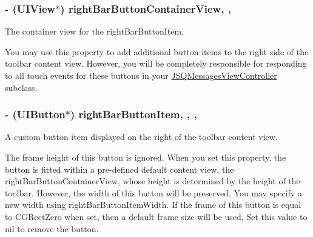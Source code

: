\subsubsection[{right\+Bar\+Button\+Container\+View}]{\setlength{\rightskip}{0pt plus 5cm}-\/ (U\+I\+View$\ast$) right\+Bar\+Button\+Container\+View\hspace{0.3cm}{\ttfamily [read]}, {\ttfamily [nonatomic]}, {\ttfamily [weak]}}\label{interface_j_s_q_messages_toolbar_content_view_a975f0ae0017e0fe18ba7f75dd12323f3}
The container view for the right\+Bar\+Button\+Item.

You may use this property to add additional button items to the right side of the toolbar content view. However, you will be completely responsible for responding to all touch events for these buttons in your {\ttfamily \hyperlink{interface_j_s_q_messages_view_controller}{J\+S\+Q\+Messages\+View\+Controller}} subclass. \hypertarget{interface_j_s_q_messages_toolbar_content_view_a376f245e23e4061f5c3bcc48304c7698}{}
\subsubsection[{right\+Bar\+Button\+Item}]{\setlength{\rightskip}{0pt plus 5cm}-\/ (U\+I\+Button$\ast$) right\+Bar\+Button\+Item\hspace{0.3cm}{\ttfamily [read]}, {\ttfamily [write]}, {\ttfamily [nonatomic]}, {\ttfamily [weak]}}\label{interface_j_s_q_messages_toolbar_content_view_a376f245e23e4061f5c3bcc48304c7698}
A custom button item displayed on the right of the toolbar content view.

The frame height of this button is ignored. When you set this property, the button is fitted within a pre-\/defined default content view, the right\+Bar\+Button\+Container\+View, whose height is determined by the height of the toolbar. However, the width of this button will be preserved. You may specify a new width using {\ttfamily right\+Bar\+Button\+Item\+Width}. If the frame of this button is equal to {\ttfamily C\+G\+Rect\+Zero} when set, then a default frame size will be used. Set this value to {\ttfamily nil} to remove the button. \hypertarget{interface_j_s_q_messages_toolbar_content_view_a6b885f81a85a228cf38eaf6087ce7d39}{}
